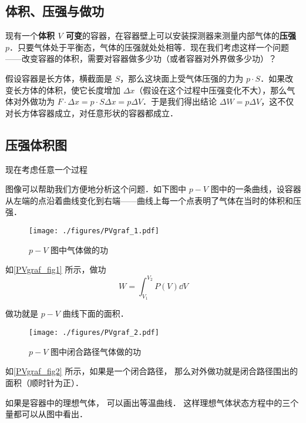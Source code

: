 
\begin{issues}
\issueDraft
\end{issues}


\subsection{体积、压强与做功}
现有一个\textbf{体积 $V$ 可变}的容器，在容器壁上可以安装探测器来测量内部气体的\textbf{压强 $p$}．只要气体处于平衡态，气体的压强就处处相等．现在我们考虑这样一个问题——改变容器的体积，需要对容器做多少功（或者容器对外界做多少功）？

假设容器是长方体，横截面是 $S$，那么这块面上受气体压强的力为 $p\cdot S$．如果改变长方体的体积，使它长度增加 $\Delta x$（假设在这个过程中压强变化不大），那么气体对外做功为 $F\cdot \Delta x=p\cdot S\Delta x=p\Delta V$．于是我们得出结论 $\Delta W=p\Delta V$，这不仅对长方体容器成立，对任意形状的容器都成立．

\subsection{压强体积图}
现在考虑任意一个过程

图像可以帮助我们方便地分析这个问题．如下图中 $p-V$ 图中的一条曲线，设容器从左端的点沿着曲线变化到右端——曲线上每一个点表明了气体在当时的体积和压强．
\begin{figure}[ht]
\centering
\texttt{[image: ./figures/PVgraf\_1.pdf]}
\caption{$p-V$ 图中气体做的功} \label{PVgraf_fig1}
\end{figure}

如\autoref{PVgraf_fig1} 所示，做功
\begin{equation}\label{PVgraf_eq1}
W = \int_{V_1}^{V_2}P(V) \dd{V}
\end{equation}

做功就是 $p-V$ 曲线下面的面积． 

\begin{figure}[ht]  
\centering
\texttt{[image: ./figures/PVgraf\_2.pdf]}
\caption{$p-V$ 图中闭合路径气体做的功} \label{PVgraf_fig2}
\end{figure}

如\autoref{PVgraf_fig2} 所示，如果是一个闭合路径， 那么对外做功就是闭合路径围出的面积（顺时针为正）．

如果是容器中的理想气体， 可以画出等温曲线． 这样理想气体状态方程中的三个量都可以从图中看出．
  